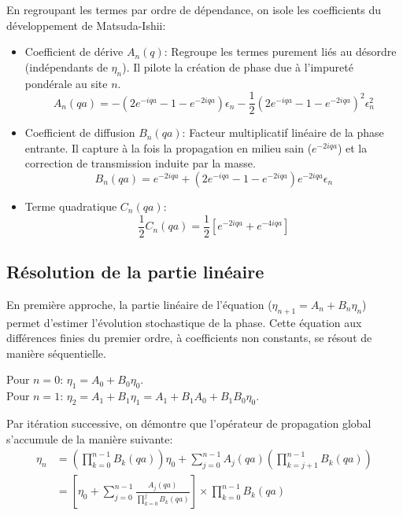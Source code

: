En regroupant les termes par ordre de dépendance, on isole les coefficients du développement de Matsuda-Ishii:
\begin{itemize}
    \item Coefficient de dérive $A_n(q)$: Regroupe les termes purement liés au désordre (indépendants de $\eta_n$). Il pilote la création de phase due à l'impureté pondérale au site $n$.
    \begin{equation*}
        A_n(qa) = - (2e^{-iqa} - 1 - e^{-2iqa})\epsilon_n - \frac{1}{2}{\left(2e^{-iqa} - 1 - e^{-2iqa}\right)}^2 \epsilon_n^2
    \end{equation*}
    \item Coefficient de diffusion $B_n(qa)$: Facteur multiplicatif linéaire de la phase entrante. Il capture à la fois la propagation en milieu sain ($e^{-2iqa}$) et la correction de transmission induite par la masse.
    \begin{equation*}
        B_n(qa) = e^{-2iqa} + (2e^{-iqa} - 1 - e^{-2iqa})e^{-2iqa}\epsilon_n
    \end{equation*}
    \item Terme quadratique $C_n(qa)$:
    \begin{equation*}
        \frac{1}{2} C_n(qa) = \frac{1}{2} [e^{-2iqa} + e^{-4iqa}]
    \end{equation*}
\end{itemize}

\subsection{Résolution de la partie linéaire}
En première approche, la partie linéaire de l'équation ($\eta_{n+1} = A_n + B_n \eta_n$) permet d'estimer l'évolution stochastique de la phase. Cette équation aux différences finies du premier ordre, à coefficients non constants, se résout de manière séquentielle.

Pour $n=0$: $\eta_1 = A_0 + B_0 \eta_0$. \\
Pour $n=1$: $\eta_2 = A_1 + B_1 \eta_1 = A_1 + B_1 A_0 + B_1 B_0 \eta_0$.

Par itération successive, on démontre que l'opérateur de propagation global s'accumule de la manière suivante:
\begin{align*}
    \eta_n &= \left( \prod_{k=0}^{n-1} B_k(qa) \right) \eta_0 + \sum_{j=0}^{n-1} A_j(qa) \left( \prod_{k=j+1}^{n-1} B_k(qa) \right) \\
    &= \left[ \eta_0 + \sum_{j=0}^{n-1} \frac{A_j(qa)}{\prod_{k=0}^{j} B_k(qa)} \right] \times \prod_{k=0}^{n-1} B_k(qa)
\end{align*}

